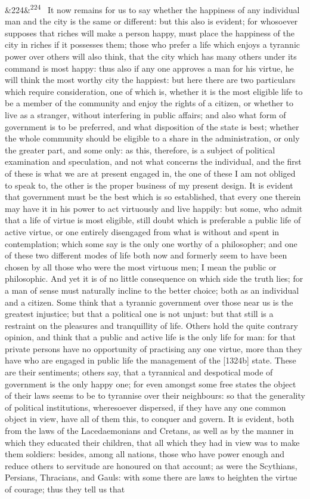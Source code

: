 \documentclass[12pt]{article}
\newcommand{\para}[1][]{\par\noindent\ifx&#1&\else\textsuperscript{\footnotesize #1}~\fi}
\begin{document}
\para[224] It now remains for us to say whether the happiness of any individual man and the city is the same or different: but this also is evident; for whosoever supposes that riches will make a person happy, must place the happiness of the city in riches if it possesses them; those who prefer a life which enjoys a tyrannic power over others will also think, that the city which has many others under its command is most happy: thus also if any one approves a man for his virtue, he will think the most worthy city the happiest: but here there are two particulars which require consideration, one of which is, whether it is the most eligible life to be a member of the community and enjoy the rights of a citizen, or whether to live as a stranger, without interfering in public affairs; and also what form of government is to be preferred, and what disposition of the state is best; whether the whole community should be eligible to a share in the administration, or only the greater part, and some only: as this, therefore, is a subject of political examination and speculation, and not what concerns the individual, and the first of these is what we are at present engaged in, the one of these I am not obliged to speak to, the other is the proper business of my present design. It is evident that government must be the best which is so established, that every one therein may have it in his power to act virtuously and live happily: but some, who admit that a life of virtue is most eligible, still doubt which is preferable a public life of active virtue, or one entirely disengaged from what is without and spent in contemplation; which some say is the only one worthy of a philosopher; and one of these two different modes of life both now and formerly seem to have been chosen by all those who were the most virtuous men; I mean the public or philosophic. And yet it is of no little consequence on which side the truth lies; for a man of sense must naturally incline to the better choice; both as an individual and a citizen. Some think that a tyrannic government over those near us is the greatest injustice; but that a political one is not unjust: but that still is a restraint on the pleasures and tranquillity of life. Others hold the quite contrary opinion, and think that a public and active life is the only life for man: for that private persons have no opportunity of practising any one virtue, more than they have who are engaged in public life the management of the [1324b] state. These are their sentiments; others say, that a tyrannical and despotical mode of government is the only happy one; for even amongst some free states the object of their laws seems to be to tyrannise over their neighbours: so that the generality of political institutions, wheresoever dispersed, if they have any one common object in view, have all of them this, to conquer and govern. It is evident, both from the laws of the Lacedaemonians and Cretans, as well as by the manner in which they educated their children, that all which they had in view was to make them soldiers: besides, among all nations, those who have power enough and reduce others to servitude are honoured on that account; as were the Scythians, Persians, Thracians, and Gauls: with some there are laws to heighten the virtue of courage; thus they tell us that 
\end{document}
